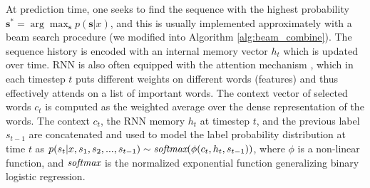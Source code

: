 At prediction time, one seeks to find the sequence with the highest probability $\mathbf{s}^*=\arg\max_\mathbf{s} p(\mathbf{s}|x)$, and this is usually implemented approximately with a beam search procedure \cite{lowerre1976harpy} (we modified into Algorithm \ref{alg:beam_combine}). The sequence history is encoded with an internal memory vector $h_t$ which is updated over time. RNN is also often equipped with the attention mechanism \cite{DBLP:journals/corr/BahdanauCB14}, which in each timestep $t$ puts different weights on different words (features) and thus effectively attends on a list of important words. The context vector of selected words $c_t$ is computed as the weighted average over the dense representation of the words. The context $c_t$, the RNN memory $h_t$ at timestep $t$, and the previous label ${s_{t-1}}$ are concatenated and used to model the label probability distribution at time $t$ as $p(s_t|x,s_1,s_2,...,s_{t-1}) \sim  \textit{softmax}(\phi(c_t,h_t,s_{t-1}))$, where $\phi$ is a non-linear function, and $\textit{softmax}$ is the normalized exponential function generalizing binary logistic regression. %


